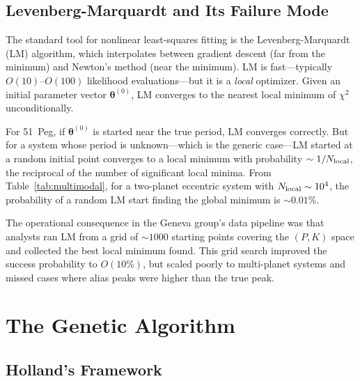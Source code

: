 \documentclass[12pt]{article}
\begin{document}
\subsection{Levenberg-Marquardt and Its Failure Mode}

The standard tool for nonlinear least-squares fitting is the
Levenberg-Marquardt (LM) algorithm, which interpolates between
gradient descent (far from the minimum) and Newton's method (near
the minimum).  LM is fast---typically $O(10)$--$O(100)$ likelihood
evaluations---but it is a \emph{local} optimizer.  Given an initial
parameter vector $\boldsymbol\theta^{(0)}$, LM converges to the
nearest local minimum of $\chi^2$ unconditionally.

For 51~Peg, if $\boldsymbol\theta^{(0)}$ is started near the true
period, LM converges correctly.  But for a system whose period is
unknown---which is the generic case---LM started at a random initial
point converges to a local minimum with probability
$\sim 1/N_{\rm local}$, the reciprocal of the number of significant
local minima.  From Table~\ref{tab:multimodal}, for a two-planet
eccentric system with $N_{\rm local} \sim 10^4$, the probability of
a random LM start finding the global minimum is $\sim 0.01\%$.

The operational consequence in the Geneva group's data pipeline was
that analysts ran LM from a grid of $\sim 1000$ starting points
covering the $(P, K)$ space and collected the best local minimum
found.  This grid search improved the success probability to
$O(10\%)$, but scaled poorly to multi-planet systems and missed
cases where alias peaks were higher than the true peak.

\section{The Genetic Algorithm}
\label{sec:ga}

\subsection{Holland's Framework}
\end{document}
